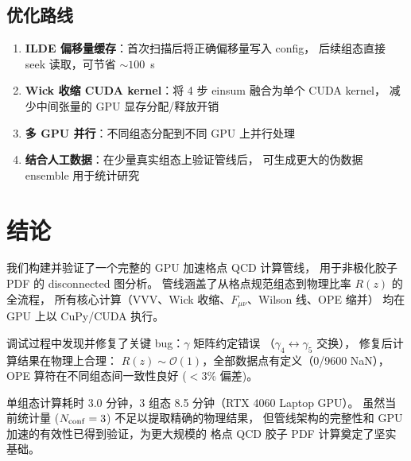 \documentclass[11pt,a4paper]{article}
\begin{document}
\subsection{优化路线}

\begin{enumerate}[leftmargin=*]
  \item \textbf{ILDE 偏移量缓存}：首次扫描后将正确偏移量写入 config，
    后续组态直接 seek 读取，可节省 $\sim 100$~s
  \item \textbf{Wick 收缩 CUDA kernel}：将 4 步 einsum 融合为单个 CUDA kernel，
    减少中间张量的 GPU 显存分配/释放开销
  \item \textbf{多 GPU 并行}：不同组态分配到不同 GPU 上并行处理
  \item \textbf{结合人工数据}：在少量真实组态上验证管线后，
    可生成更大的伪数据 ensemble 用于统计研究
\end{enumerate}

\section{结论}

我们构建并验证了一个完整的 GPU 加速格点 QCD 计算管线，
用于非极化胶子 PDF 的 disconnected 图分析。
管线涵盖了从格点规范组态到物理比率 $R(z)$ 的全流程，
所有核心计算（VVV、Wick 收缩、$F_{\mu\nu}$、Wilson 线、OPE 缩并）
均在 GPU 上以 CuPy/CUDA 执行。

调试过程中发现并修复了关键 bug：$\gamma$ 矩阵约定错误
（$\gamma_4 \leftrightarrow \gamma_5$ 交换），
修复后计算结果在物理上合理：
$R(z) \sim \mathcal{O}(1)$，全部数据点有定义（0/9600 NaN），
OPE 算符在不同组态间一致性良好 ($< 3\%$ 偏差)。

单组态计算耗时 3.0 分钟，3 组态 8.5 分钟（RTX 4060 Laptop GPU）。
虽然当前统计量 ($N_{\rm conf}=3$) 不足以提取精确的物理结果，
但管线架构的完整性和 GPU 加速的有效性已得到验证，为更大规模的
格点 QCD 胶子 PDF 计算奠定了坚实基础。
\end{document}

